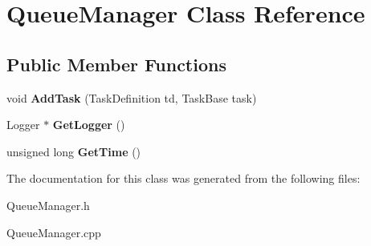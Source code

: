 \hypertarget{class_queue_manager}{}\section{Queue\+Manager Class Reference}
\label{class_queue_manager}
\subsection*{Public Member Functions}
\begin{DoxyCompactItemize}
\item 
\hypertarget{class_queue_manager_a11e056b65033377927e14cc101a21c13}{}void {\bfseries Add\+Task} (Task\+Definition td, Task\+Base task)\label{class_queue_manager_a11e056b65033377927e14cc101a21c13}

\item 
\hypertarget{class_queue_manager_a85fda8e25818019f1f62cc29b7f7cd6d}{}Logger $\ast$ {\bfseries Get\+Logger} ()\label{class_queue_manager_a85fda8e25818019f1f62cc29b7f7cd6d}

\item 
\hypertarget{class_queue_manager_a66099fb771c3279a705c08558a3d9aa1}{}unsigned long {\bfseries Get\+Time} ()\label{class_queue_manager_a66099fb771c3279a705c08558a3d9aa1}

\end{DoxyCompactItemize}


The documentation for this class was generated from the following files\+:\begin{DoxyCompactItemize}
\item 
Queue\+Manager.\+h\item 
Queue\+Manager.\+cpp\end{DoxyCompactItemize}
